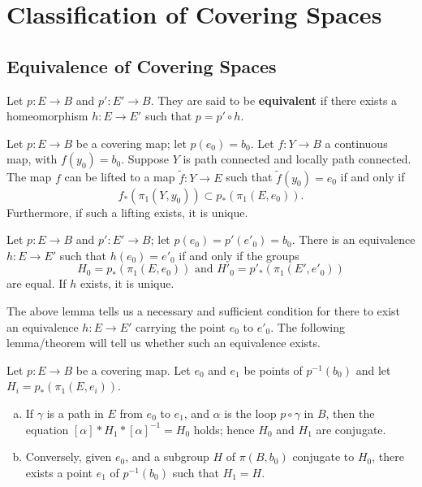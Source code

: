 \section{Classification of Covering Spaces}

\setcounter{subsection}{78}
\subsection{Equivalence of Covering Spaces}

\begin{definition}
Let $p \colon E \rightarrow B$ and $p' \colon E' \rightarrow B$. They are said to be \textbf{equivalent} if there exists a homeomorphism
$h \colon E \rightarrow E'$ such that $p = p' \circ h$. 
\end{definition}

\begin{lemma}
Let $p\colon E \rightarrow B$ be a covering map; let $p(e_0) = b_0$. Let $f\colon Y \rightarrow B$ a continuous map, with $f(y_0) = b_0$. 
Suppose $Y$ is path connected and locally path connected. The map $f$ can be lifted to a map
$\tilde{f} \colon  Y \rightarrow E$ such that $\tilde{f}(y_0) = e_0$ if and only if
\[
    f_{\ast}(\pi_1(Y, y_0)) \subset p_{\ast}(\pi_1(E, e_0)).
\]
Furthermore, if such a lifting exists, it is unique.
\end{lemma}

\begin{theorem}
Let $p \colon E \rightarrow B$ and $p' \colon E' \rightarrow B$; let $p(e_0) = p'(e'_0) = b_0$. There is an equivalence $h \colon E \rightarrow E'$ such that $h(e_0) = e'_0$ if and only if the groups
\[
    H_0 = p_*(\pi_1(E, e_0)) \text{ and } H'_0 = p'_*(\pi_1(E', e'_0))
\]
are equal. If $h$ exists, it is unique.
\end{theorem}

The above lemma tells us a necessary and sufficient condition for there to exist an equivalence $h \colon E \rightarrow E'$ carrying the point $e_0$ to $e'_0$. The following lemma/theorem will tell us whether such an equivalence exists. 

\begin{lemma}
Let $p \colon E \rightarrow B$ be a covering map. Let $e_0$ and $e_1$ be points of $p^{-1}(b_0)$ and let $H_i = p_*(\pi_1(E, e_i))$.
\begin{enumerate}[a)]
    \item If $\gamma$ is a path in $E$ from $e_0$ to $e_1$, and $\alpha$ is the loop $p \circ \gamma$ in $B$, then the equation $[\alpha] * H_1 * [\alpha]^{-1} = H_0$ holds; hence $H_0$ and $H_1$ are conjugate.
    \item Conversely, given $e_0$, and a subgroup $H$ of $\pi(B, b_0)$ conjugate to $H_0$, there exists a point $e_1$ of $p^{-1}(b_0)$ such that $H_1 = H$.
\end{enumerate}
\end{lemma}

